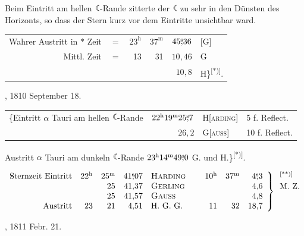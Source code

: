 Beim Eintritt am hellen $\ObsMoon$-Rande zitterte der $\ObsMoon$ zu sehr in den Dünsten des Horizonts, so dass der Stern kurz vor dem Eintritte unsichtbar ward.
\begin{center}\begin{tabular}{rr rrr l}
Wahrer Austritt in $\ast$ Zeit&$=$&$23^{\mathrm h}$&$37^{\mathrm m}$&$45\mathord{\overset{\mathrm{s}}{,}}36$&[G]\\
Mittl. Zeit&$=$&13&31&$10{,}46$&G\\
&&&&$10{,}8$&H\}\textsuperscript{[*)]}.
\end{tabular}\end{center}
\medskip{}, 1810 September 18.
\begin{center}\small\setlength{\tabcolsep}{3pt}
\begin{tabular}{lrll}
\{Eintritt $\alpha$ Tauri am hellen $\ObsMoon$-Rande&$22^{\mathrm h}19^{\mathrm m}25\mathord{\overset{\mathrm{s}}{,}}7$&H[\textsc{arding}]&5 f. Reflect.\\
&$26{,}2$&G[\textsc{auss}]&10 f. Reflect.
\end{tabular}
\end{center}
\noindent\hspace*{\parindent}Austritt $\alpha$ Tauri am dunkeln $\ObsMoon$-Rande $23^{\mathrm h}14^{\mathrm m}49\mathord{\overset{\mathrm{s}}{,}}0$ G. und H.\}\textsuperscript{[*)]}.
\begin{center}\small\setlength{\arraycolsep}{3pt}
$\begin{array}{lrrrl}
\text{Sternzeit Eintritt}&22^{\mathrm h}&25^{\mathrm m}&\ObsSec{41}{07}&\text{\textsc{Harding}}\\
&&25&41{,}37&\text{\textsc{Gerling}}\\
&&25&41{,}57&\text{\textsc{Gauss}}\\
\hfill\text{Austritt}&23&21&4{,}51&\mathrm{H.\ G.\ G.}
\end{array}\quad
\left.\begin{array}{rrr}
10^{\mathrm h}&37^{\mathrm m}&\ObsSec43\\
&&4{,}6\\
&&4{,}8\\
11&32&18{,}7
\end{array}\right\}\begin{array}{l}
\text{\textsuperscript{[**)]}}\\
\mathrm{M.\ Z.}\\
\phantom{\mathrm{M.\ Z.}}\\
\phantom{\mathrm{M.\ Z.}}
\end{array}$
\end{center}
\begingroup\renewcommand{\thefootnote}{[*)}\footnotetext{\textsc{Harding}’s Handschrift.]}\endgroup
\begingroup\renewcommand{\thefootnote}{[**)}\footnotetext{\textsc{Gauss}’ Handschrift.]}\endgroup
\medskip{}, 1811 Febr. 21.

